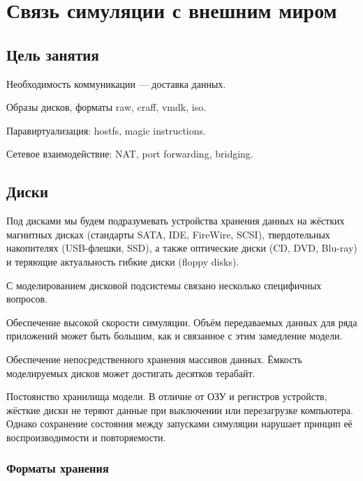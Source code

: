 \chapter{Связь симуляции с внешним миром}\label{chap:lab03}

\section{Цель занятия}

Необходимость коммуникации --- доставка данных.

\begin{enumerate*}
    \item Образы дисков, форматы raw, craff, vmdk, iso.
    \item Паравиртуализация: hostfs, magic instructions.
    \item Сетевое взаимодействие: NAT, port forwarding, bridging.
\end{enumerate*}

\section{Диски}

Под дисками мы будем подразумевать устройства хранения данных на жёстких магнитных дисках (стандарты SATA, IDE, FireWire, SCSI), твердотельных накопителях (USB-флешки, SSD), а также оптические диски (CD, DVD, Blu-ray) и теряющие актуальность гибкие диски (\abbr floppy disks).

С моделированием дисковой подсистемы связано несколько специфичных вопросов.

\begin{itemize*}
\item Обеспечение высокой скорости симуляции. Объём передаваемых данных для ряда приложений может быть большим, как и связанное с этим замедление модели.
\item Обеспечение непосредственного хранения массивов данных. Ёмкость моделируемых дисков может достигать десятков терабайт.
\item Постоянство хранилища модели. В отличие от ОЗУ и регистров устройств, жёсткие диски не теряют данные при выключении или перезагрузке компьютера. Однако сохранение состояния между запусками симуляции нарушает принцип её воспроизводимости и повторяемости.
\end{itemize*}

\subsection{Форматы хранения}

